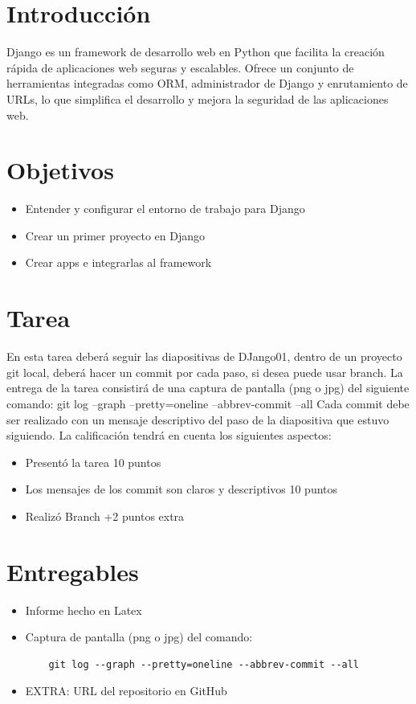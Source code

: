 \documentclass{article}
\begin{document}
  \section{Introducción}
  Django es un framework de desarrollo web en Python que facilita la creación rápida de aplicaciones web seguras y escalables.
  Ofrece un conjunto de herramientas integradas como ORM, administrador de Django y enrutamiento de URLs, lo que simplifica el 
  desarrollo y mejora la seguridad de las aplicaciones web.


  \section{Objetivos}
  \begin{itemize}
    \item Entender y configurar el entorno de trabajo para Django
    \item Crear un primer proyecto en Django
    \item Crear apps e integrarlas al framework
  \end{itemize}

 
	\section{Tarea}
  En esta tarea deberá seguir las diapositivas de DJango01, dentro de un proyecto git local, deberá hacer un commit 
  por cada paso, si desea puede usar branch. La entrega de la tarea consistirá de una captura de pantalla (png o jpg) 
  del siguiente comando:
  \newline
  git log --graph --pretty=oneline --abbrev-commit --all
  \newline
  Cada commit debe ser realizado con un mensaje descriptivo del paso de la diapositiva que estuvo siguiendo.
  \newpage
  La calificación tendrá en cuenta los siguientes aspectos:
  \begin{itemize}
    \item Presentó la tarea 10 puntos
    \item Los mensajes de los commit son claros y descriptivos 10 puntos
    \item Realizó Branch +2 puntos extra
  \end{itemize}
 
 
  \section{Entregables}
  \begin{itemize}
    \item Informe hecho en Latex
    \item Captura de pantalla (png o jpg) del comando:
    \begin{lstlisting}
    git log --graph --pretty=oneline --abbrev-commit --all
    \end{lstlisting}
    
    \item EXTRA: URL del repositorio en GitHub
  \end{itemize}
  
\end{document}
